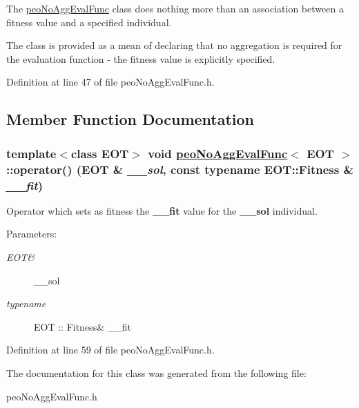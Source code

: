 The \hyperlink{classpeoNoAggEvalFunc}{peo\-No\-Agg\-Eval\-Func} class does nothing more than an association between a fitness value and a specified individual. 

The class is provided as a mean of declaring that no aggregation is required for the evaluation function - the fitness value is explicitly specified. 



Definition at line 47 of file peo\-No\-Agg\-Eval\-Func.h.

\subsection{Member Function Documentation}
\hypertarget{classpeoNoAggEvalFunc_1a69ee1af8745ac75c864bf884436de5}{
\subsubsection[operator()]{\setlength{\rightskip}{0pt plus 5cm}template$<$class EOT$>$ void \hyperlink{classpeoNoAggEvalFunc}{peo\-No\-Agg\-Eval\-Func}$<$ EOT $>$::operator() (EOT \& {\em \_\-\_\-sol}, const typename EOT::Fitness \& {\em \_\-\_\-fit})}}
\label{classpeoNoAggEvalFunc_1a69ee1af8745ac75c864bf884436de5}


Operator which sets as fitness the {\bf \_\-\_\-fit} value for the {\bf \_\-\_\-sol} individual. 

\begin{Desc}
\item[Parameters:]
\begin{description}
\item[{\em EOT\&}]\_\-\_\-sol \item[{\em typename}]EOT :: Fitness\& \_\-\_\-fit \end{description}
\end{Desc}


Definition at line 59 of file peo\-No\-Agg\-Eval\-Func.h.

The documentation for this class was generated from the following file:\begin{CompactItemize}
\item 
peo\-No\-Agg\-Eval\-Func.h\end{CompactItemize}
